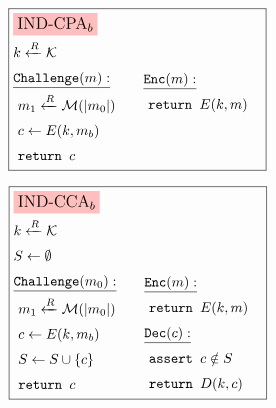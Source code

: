 \begin{game}
\captionsetup{justification=centering}
$$
\boxed{
\begin{aligned}
&\colorbox{pink}{\large $\text{IND-CPA}_b$}\cr
&k \xleftarrow{R} \mathcal{K}\cr
&\begin{aligned}
    &\underline{\texttt{Challenge}(m):}\cr
    &\ m_1 \xleftarrow{R} \mathcal{M}(|m_0|)\cr
    &\ c \gets E(k, m_b)\cr
    &\ \texttt{return } c\cr
\end{aligned}
&\begin{aligned}
    &\underline{\texttt{Enc}(m):}\cr
    &\ \texttt{return } E(k, m)\cr
    &\cr
    &\cr
\end{aligned}\cr
\end{aligned}
}
$$
\caption{$\text{IND-CPA}_b$}
\label{game:ind-cpa}
\end{game}
\begin{game}
\captionsetup{justification=centering}
$$
\boxed{
\begin{aligned}
&\colorbox{pink}{\large $\text{IND-CCA}_b$}\cr
&k \xleftarrow{R} \mathcal{K}\cr
&S \gets \emptyset\cr
&\begin{aligned}
    &\underline{\texttt{Challenge}(m_0):}\cr
    &\ m_1 \xleftarrow{R} \mathcal{M}(|m_0|)\cr
    &\ c \gets E(k, m_b)\cr
    &\ S \gets S \cup \{c\}\cr
    &\ \texttt{return } c\cr
\end{aligned}
&\begin{aligned}
    &\underline{\texttt{Enc}(m):}\cr
    &\ \texttt{return } E(k, m)\cr
    &\underline{\texttt{Dec}(c):}\cr
    &\ \texttt{assert } c \notin S\cr
    &\ \texttt{return } D(k, c)\cr
\end{aligned}\cr
\end{aligned}
}
$$
\caption{$\text{IND-CCA}_b$}
\label{game:ind-cca}
\end{game}


